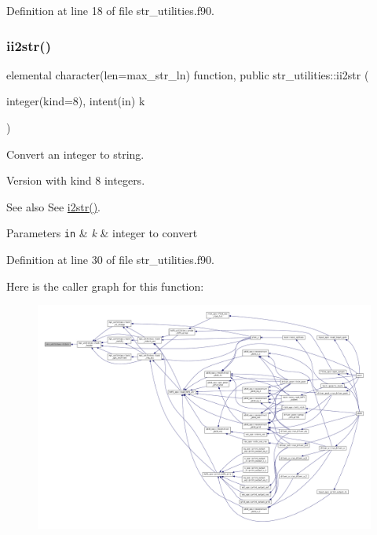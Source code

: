 Definition at line 18 of file str\+\_\+utilities.\+f90.

\mbox{\label{namespacestr__utilities_acb8c4e66aead51f178e47fdea8d7a7db}} 
\subsubsection{\texorpdfstring{ii2str()}{ii2str()}}
{\footnotesize\ttfamily elemental character(len=max\+\_\+str\+\_\+ln) function, public str\+\_\+utilities\+::ii2str (\begin{DoxyParamCaption}\item[{integer(kind=8), intent(in)}]{k }\end{DoxyParamCaption})}



Convert an integer to string. 

Version with kind 8 integers.

\begin{DoxySeeAlso}{See also}
See \hyperlink{namespacestr__utilities_a0b97e51770725a3e98ed393d26681414}{i2str()}.
\end{DoxySeeAlso}

\begin{DoxyParams}[1]{Parameters}
\mbox{\tt in}  & {\em k} & integer to convert \\
\hline
\end{DoxyParams}


Definition at line 30 of file str\+\_\+utilities.\+f90.

Here is the caller graph for this function\+:
\nopagebreak
\begin{figure}[H]
\begin{center}
\leavevmode
\includegraphics[width=350pt]{namespacestr__utilities_acb8c4e66aead51f178e47fdea8d7a7db_icgraph}
\end{center}
\end{figure}
\mbox{\label{namespacestr__utilities_a6ab16f33c155db79844279c6a56a494c}} 
